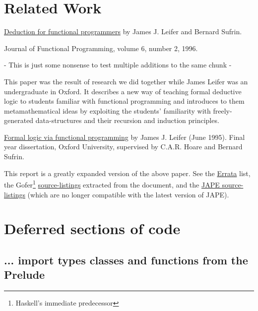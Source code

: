 \documentclass[11pt]{article}
\begin{document}
\section{Related Work}

\href{http://pauillac.inria.fr/~leifer/articles/logic/LogicPearl.dvi.gz}
{Deduction for functional programmers} by James J. Leifer and Bernard Sufrin.

Journal of Functional Programming, volume 6, number 2, 1996.
\begin{code}[... Prelude]

  {- This is just some nonsense to test
     multiple additions to the same chunk
  -}

\end{code}
This paper was the result of research we did together while James Leifer was an undergraduate 
in Oxford. It describes a new way of
teaching formal deductive logic to students familiar with functional
programming and introduces to them metamathematical ideas by
exploiting the students' familiarity with freely-generated
data-structures and their recursion and induction principles.

\href{http://pauillac.inria.fr/~leifer/articles/logic/LogicviaFP.300.ps.gz}
{Formal logic via functional programming} by James J. Leifer (June 1995).
Final year dissertation, Oxford University, supervised by
C.A.R. Hoare and Bernard Sufrin.

This report is a greatly expanded version of the above paper. See
the
\href{http://pauillac.inria.fr/~leifer/articles/logic/LogicviaFP.Errata}
{Errata} list, the Gofer\footnote{Haskell's immediate predecessor}
\href{http://pauillac.inria.fr/~leifer/articles/logic/LogicviaFP.gs}
{source-listings} extracted from the document, and the
\href{http://pauillac.inria.fr/~leifer/articles/logic/LogicviaFP.j} {JAPE
source-listings} (which are no longer compatible with the
latest version of JAPE).

\appendix
\section{Deferred sections of code}

\subsection{... import types classes and functions from the Prelude}
\end{document}
